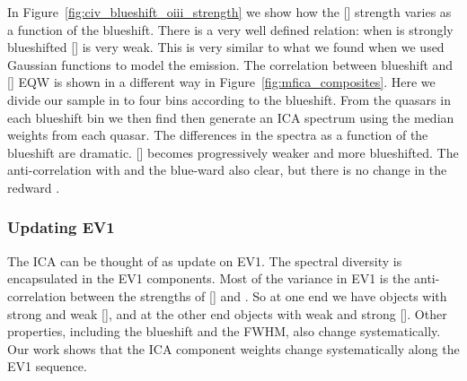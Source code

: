 In Figure~\ref{fig:civ_blueshift_oiii_strength} we show how the [] strength varies as a function of the  blueshift. 
There is a very well defined relation: when  is strongly blueshifted [] is very weak. 
This is very similar to what we found when we used Gaussian functions to model the emission. 
The correlation between  blueshift and [] EQW is shown in a different way in Figure~\ref{fig:mfica_composites}. 
Here we divide our sample in to four bins according to the  blueshift. 
From the quasars in each  blueshift bin we then find then generate an \ac{ICA} spectrum using the median weights from each quasar. 
The differences in the spectra as a function of the  blueshift are dramatic. 
[] becomes progressively weaker and more blueshifted.
The anti-correlation with  and the blue-ward  also clear, but there is no change in the redward . 

\subsubsection{Updating \ac{EV1}}

The \ac{ICA} can be thought of as update on \ac{EV1}. 
The spectral diversity is encapsulated in the \ac{EV1} components. 
Most of the variance in \ac{EV1} is the anti-correlation between the strengths of [] and . 
So at one end we have objects with strong  and weak [], and at the other end objects with weak  and strong []. 
Other properties, including the  blueshift and the \hb \ac{FWHM}, also change systematically. 
Our work shows that the \ac{ICA} component weights change systematically along the \ac{EV1} sequence. 

